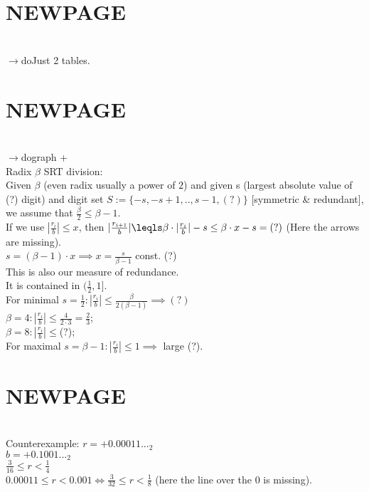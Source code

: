     \section*{NEWPAGE} \\
    $\to$do{Just 2 tables.}
    \bigskip
   
    \section*{NEWPAGE} \\
    $\to$do{graph +} \\
   
    Radix $\beta$ SRT division:\\
    Given $\beta$ (even radix usually a power of $2$) and given s (largest absolute value of (?) digit) and digit set $S:=\{-s,-s+1,..,s-1,(?)\}$ [symmetric & redundant], we assume that $\frac{\beta}{2}\le \beta-1$. \\
   
    If we use $|\frac{r_i}{b}|\le x$, then $|\frac{r_{i+1}}{b}|\leqls
     \beta \cdot |\frac{r_i}{b}|-s\le \beta\cdot x-s = (?) $ (Here the arrows are missing). \\
     
     \implies $s=(\beta-1)\cdot x\implies x=\frac{s}{\beta-1}$ const. (?)\\
     This is also our measure of redundance. \\
     It is contained in $(\frac{1}{2},1]$. \\
     For minimal $s=\frac{1}{2}: |\frac{r_i}{b}|\le \frac{\beta}{2(\beta-1)}\implies (?)$ \\
     
     $\beta=4: |\frac{r_i}{b}|\le \frac{4}{2\cdot 3}=\frac{2}{3}$;\\
     $\beta=8: |\frac{r_i}{b}|\le $(?);\\
     
     For maximal $s=\beta-1: |\frac{r_i}{b}|\le 1\implies$ large (?).\bigskip
     
     \section*{NEWPAGE}\\
     
     Counterexample: $r=+0.00011 ..._2$ \\
     $b=+0.1001..._2$ \\
     $\frac{3}{16}\le r<\frac{1}{4}$ \\
     \implies $0.00011\le r<0.001 \iff \frac{3}{32}\le r<\frac{1}{8}$ (here the line over the 0 is missing). \\
     
